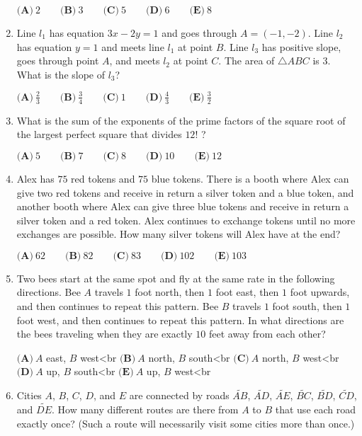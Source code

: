 \documentclass{article}
\begin{document}
\begin{enumerate}[label=\arabic*., itemsep=0.5em]
$\textbf{(A)}\ 2 \qquad \textbf{(B)}\ 3 \qquad \textbf{(C)}\ 5 \qquad \textbf{(D)}\ 6 \qquad \textbf{(E)}\ 8$\par \vspace{0.5em}\item Line $l_1$ has equation $3x - 2y = 1$ and goes through $A = (-1, -2)$. Line $l_2$ has equation $y = 1$ and meets line $l_1$ at point $B$. Line $l_3$ has positive slope, goes through point $A$, and meets $l_2$ at point $C$. The area of $\triangle ABC$ is $3$. What is the slope of $l_3$?

$\textbf{(A)}\ \frac{2}{3} \qquad \textbf{(B)}\ \frac{3}{4} \qquad \textbf{(C)}\ 1 \qquad \textbf{(D)}\ \frac{4}{3} \qquad \textbf{(E)}\ \frac{3}{2}$\par \vspace{0.5em}\item What is the sum of the exponents of the prime factors of the square root of the largest perfect square that divides $12!$ ?

$\textbf{(A)}\ 5 \qquad \textbf{(B)}\ 7 \qquad \textbf{(C)}\ 8 \qquad \textbf{(D)}\ 10 \qquad \textbf{(E)}\ 12 $\par \vspace{0.5em}\item Alex has $75$ red tokens and $75$ blue tokens. There is a booth where Alex can give two red tokens and receive in return a silver token and a blue token, and another booth where Alex can give three blue tokens and receive in return a silver token and a red token. Alex continues to exchange tokens until no more exchanges are possible. How many silver tokens will Alex have at the end?

$\textbf{(A)}\ 62 \qquad \textbf{(B)}\ 82 \qquad \textbf{(C)}\ 83 \qquad \textbf{(D)}\ 102 \qquad \textbf{(E)}\ 103$\par \vspace{0.5em}\item Two bees start at the same spot and fly at the same rate in the following directions. Bee $A$ travels $1$ foot north, then $1$ foot east, then $1$ foot upwards, and then continues to repeat this pattern. Bee $B$ travels $1$ foot south, then $1$ foot west, and then continues to repeat this pattern. In what directions are the bees traveling when they are exactly $10$ feet away from each other?

$\textbf{(A)}\ A$ east, $B$ west<br \>$\textbf{(B)}\ A$ north, $B$ south<br \>$\textbf{(C)}\ A$ north, $B$ west<br \>$\textbf{(D)}\ A$ up, $B$ south<br \>$\textbf{(E)}\ A$ up, $B$ west<br \>\par \vspace{0.5em}\item Cities $A$, $B$, $C$, $D$, and $E$ are connected by roads $\widetilde{AB}$, $\widetilde{AD}$, $\widetilde{AE}$, $\widetilde{BC}$, $\widetilde{BD}$, $\widetilde{CD}$, and $\widetilde{DE}$. How many different routes are there from $A$ to $B$ that use each road exactly once? (Such a route will necessarily visit some cities more than once.)


\end{enumerate}
\end{document}
